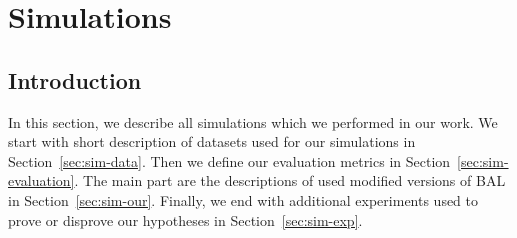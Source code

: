 
\section{Simulations}
\label{sec:simulations} 

\subsection*{Introduction} 
In this section, we describe all simulations which we performed in our work. We start with short description of datasets used for our simulations in Section~\ref{sec:sim-data}. Then we define our evaluation metrics in Section~\ref{sec:sim-evaluation}. The main part are the descriptions of used modified versions of BAL in Section~\ref{sec:sim-our}. Finally, we end with additional experiments used to prove or disprove our hypotheses in Section~\ref{sec:sim-exp}.



 

 

 
